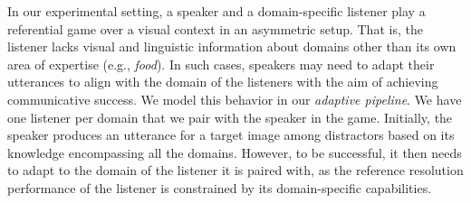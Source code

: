 In our experimental setting, a speaker and a domain-specific listener play a referential game over a visual context in an asymmetric setup. That is, the listener lacks visual and linguistic information about domains other than its own area of expertise (e.g., \emph{food}).
In such cases, speakers may need to adapt their utterances to align with the domain of the listeners with the aim of achieving communicative success. %
We model this behavior in our \textit{adaptive pipeline}. We have one listener per domain that we pair with the speaker in the game. Initially, the speaker produces an utterance for a target image among distractors based on its knowledge encompassing all the domains. However, to be successful, it then needs to adapt to the domain of the listener it is paired with, as the reference resolution performance of the listener is constrained by its domain-specific capabilities.


